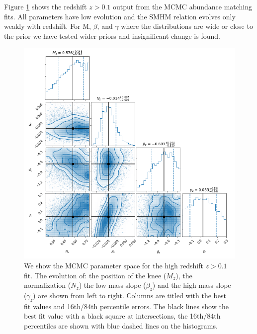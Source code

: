 Figure \ref{fig:MCMC_hz} shows the redshift $z > 0.1$ output from the MCMC abundance matching fits. All parameters have low evolution and the SMHM relation evolves only weakly with redshift. For M, $\beta$, and $\gamma$ where the distributions are wide  or close to the prior we have tested wider priors and insignificant change is found.

\begin{figure}
	\centering
	\includegraphics[width = \linewidth]{Appendices/AbnMCMC/MCMC_plot_hz.png}
    \caption{We show the MCMC parameter space for the high redshift $z > 0.1$ fit. The evolution of: the position of the knee ($M_z$), the normalization ($N_z$) the low mass slope ($\beta_z$) and the high mass slope ($\gamma_z$) are shown from left to right. Columns are titled with the best fit values and 16th/84th percentile errors. The black lines show the best fit value with a black square at intersections, the 16th/84th percentiles are shown with blue dashed lines on the histograms.}
	\label{fig:MCMC_hz}
\end{figure}